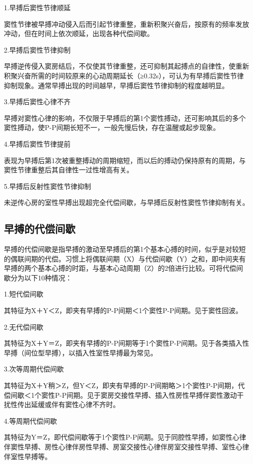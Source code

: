 1.早搏后窦性节律顺延

窦性节律被早搏冲动侵入后而引起节律重整，重新积聚兴奋后，按原有的频率发放冲动，但在时间上依次顺延，出现各种代偿间歇。

2.早搏后窦性节律抑制

早搏逆传侵入窦房结后，不仅使其节律重整，还可抑制其起搏点的自律性，使重新积聚兴奋所需的时间较原来的心动周期延长（≥0.32s），可认为有早搏后窦性节律抑制现象。通常早搏出现的时间越早，早搏后窦性节律抑制的程度越明显。

3.早搏后窦性心律不齐

早搏对窦性心律的影响，不仅限于早搏后的第1个窦性搏动，还可影响其后的多个窦性搏动，使P-P间期长短不一，一般先慢后快，存在温醒或起步现象。

4.早搏后窦性节律提前

表现为早搏后第1次被重整搏动的周期缩短，而以后的搏动仍保持原有的周期，与窦性节律重整后其自律性一过性增高有关。

5.早搏后反射性窦性节律抑制

未逆传心房的室性早搏出现超完全代偿间歇，与早搏后反射性窦性节律抑制有关。

\protect\hypertarget{text00018.htmlux5cux23subid129}{}{}

\subsection{早搏的代偿间歇}

早搏的代偿间歇是指早搏的激动至早搏后的第1个基本心搏的时间，似乎是对较短的偶联间期的代偿。习惯上将偶联间期（X）与代偿间歇（Y）之和，即中间夹有早搏的两个基本心搏的时距，与基本心动周期（Z）的2倍进行比较。可将代偿间歇分为以下10种情况：

1.短代偿间歇

其特征为X＋Y＜Z，即夹有早搏的P-P间期＜1个窦性P-P间期。见于窦性回波。

2.无代偿间歇

其特征为X＋Y＝Z，即夹有早搏的P-P间期等于1个窦性P-P间期。见于各类插入性早搏（间位型早搏），以插入性室性早搏最为常见。

3.次等周期代偿间歇

其特征为X＋Y稍＞Z，但Y＜Z，即夹有早搏的P-P间期略＞1个窦性P-P间期，代偿间歇＜1个窦性P-P间期。见于窦房交接性早搏、插入性房性早搏伴窦性激动干扰性传出延缓或伴有窦性心律不齐时。

4.等周期代偿间歇

其特征为Y＝Z，即代偿间歇等于1个窦性P-P间期。见于同腔性早搏，如窦性心律伴窦性早搏、房性心律伴房性早搏、房室交接性心律伴房室交接性早搏、室性心律伴室性早搏等。

